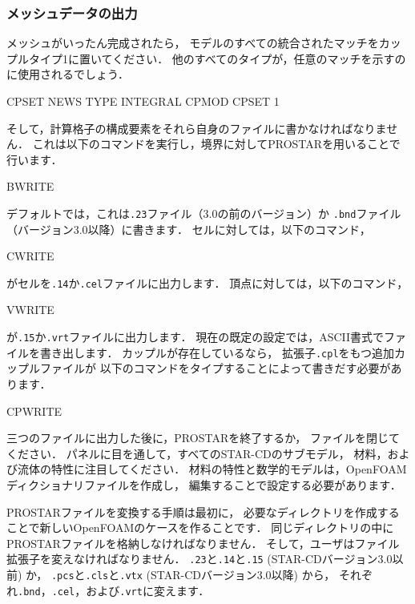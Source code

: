 \subsubsection{メッシュデータの出力}
\label{sssec:5.5.2.5}
メッシュがいったん完成されたら，
モデルのすべての統合されたマッチをカップルタイプ1に置いてください．
他のすべてのタイプが，任意のマッチを示すのに使用されるでしょう．
\begin{OFverbatim}[terminal]
CPSET NEWS TYPE INTEGRAL
CPMOD CPSET 1
\end{OFverbatim}
そして，計算格子の構成要素をそれら自身のファイルに書かなければなりません．
これは以下のコマンドを実行し，境界に対して\textsf{PROSTAR}を用いることで行います．
\begin{OFverbatim}[terminal]
BWRITE
\end{OFverbatim}
デフォルトでは，これは\texttt{.23}ファイル（3.0の前のバージョン）か
\texttt{.bnd}ファイル（バージョン3.0以降）に書きます．
セルに対しては，以下のコマンド，
\begin{OFverbatim}[terminal]
CWRITE
\end{OFverbatim}
がセルを\texttt{.14}か\texttt{.cel}ファイルに出力します．
頂点に対しては，以下のコマンド，
\begin{OFverbatim}[terminal]
VWRITE
\end{OFverbatim}
が\texttt{.15}か\texttt{.vrt}ファイルに出力します．
現在の既定の設定では，ASCII書式でファイルを書き出します．
カップルが存在しているなら，
拡張子\texttt{.cpl}をもつ追加カップルファイルが
以下のコマンドをタイプすることによって書きだす必要があります．
\begin{OFverbatim}[terminal]
CPWRITE
\end{OFverbatim}
三つのファイルに出力した後に，\textsf{PROSTAR}を終了するか，
ファイルを閉じてください．
パネルに目を通して，すべてのSTAR-CDのサブモデル，
材料，および流体の特性に注目してください．
材料の特性と数学的モデルは，OpenFOAMディクショナリファイルを作成し，
編集することで設定する必要があります．

\textsf{PROSTAR}ファイルを変換する手順は最初に，
必要なディレクトリを作成することで新しいOpenFOAMのケースを作ることです．
同じディレクトリの中に\textsf{PROSTAR}ファイルを格納しなければなりません．
そして，ユーザはファイル拡張子を変えなければなりません．
\texttt{.23}と\texttt{.14}と\texttt{.15} (STAR-CDバージョン3.0以前) か，
\texttt{.pcs}と\texttt{.cls}と\texttt{.vtx} (STAR-CDバージョン3.0以降) から，
それぞれ\texttt{.bnd}，\texttt{.cel}，および\texttt{.vrt}に変えます．

